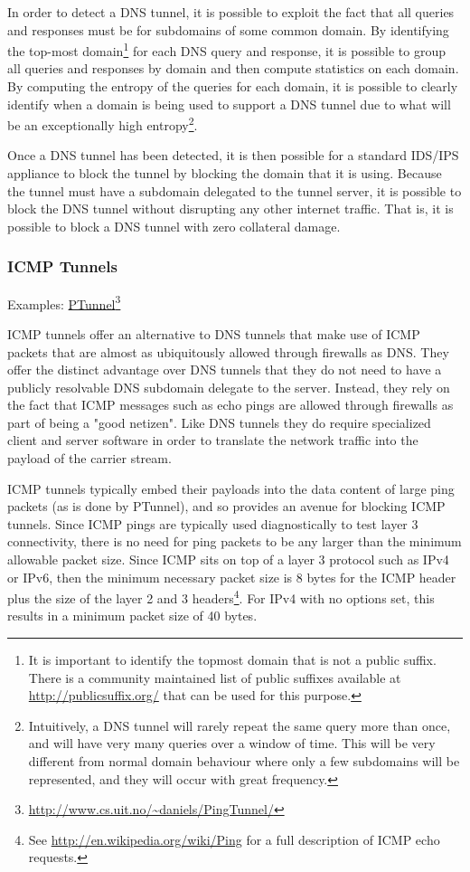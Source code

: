 \documentclass{article}
\newcommand{\hreff}[2]{\href{#1}{#2}\footnote{\url{#1}}}
\theoremstyle{remark}
\theoremstyle{definition}
\theoremstyle{definition}
\theoremstyle{definition}
\begin{document}
In order to detect a DNS tunnel, it is possible to exploit the fact that all queries and responses must be for subdomains of some common domain. By identifying the top-most domain\footnote{It is important to identify the topmost domain that is not a public suffix. There is a community maintained list of public suffixes available at \url{http://publicsuffix.org/} that can be used for this purpose.} for each DNS query and response, it is possible to group all queries and responses by domain and then compute statistics on each domain. By computing the entropy of the queries for each domain, it is possible to clearly identify when a domain is being used to support a DNS tunnel due to what will be an exceptionally high entropy\footnote{Intuitively, a DNS tunnel will rarely repeat the same query more than once, and will have very many queries over a window of time. This will be very different from normal domain behaviour where only a few subdomains will be represented, and they will occur with great frequency.}.

Once a DNS tunnel has been detected, it is then possible for a standard IDS/IPS appliance to block the tunnel by blocking the domain that it is using. Because the tunnel must have a subdomain delegated to the tunnel server, it is possible to block the DNS tunnel without disrupting any other internet traffic. That is, it is possible to block a DNS tunnel with zero collateral damage.

\subsubsection{ICMP Tunnels}
Examples: \hreff{http://www.cs.uit.no/~daniels/PingTunnel/}{PTunnel}

ICMP tunnels offer an alternative to DNS tunnels that make use of ICMP packets that are almost as ubiquitously allowed through firewalls as DNS. They offer the distinct advantage over DNS tunnels that they do not need to have a publicly resolvable DNS subdomain delegate to the server. Instead, they rely on the fact that ICMP messages such as echo pings are allowed through firewalls as part of being a "good netizen". Like DNS tunnels they do require specialized client and server software in order to translate the network traffic into the payload of the carrier stream.

ICMP tunnels typically embed their payloads into the data content of large ping packets (as is done by PTunnel), and so provides an avenue for blocking ICMP tunnels. Since ICMP pings are typically used diagnostically to test layer 3 connectivity, there is no need for ping packets to be any larger than the minimum allowable packet size. Since ICMP sits on top of a layer 3 protocol such as IPv4 or IPv6, then the minimum necessary packet size is 8 bytes for the ICMP header plus the size of the layer 2 and 3 headers\footnote{See \url{http://en.wikipedia.org/wiki/Ping} for a full description of ICMP echo requests.}. For IPv4 with no options set, this results in a minimum packet size of 40 bytes. 
\end{document}
